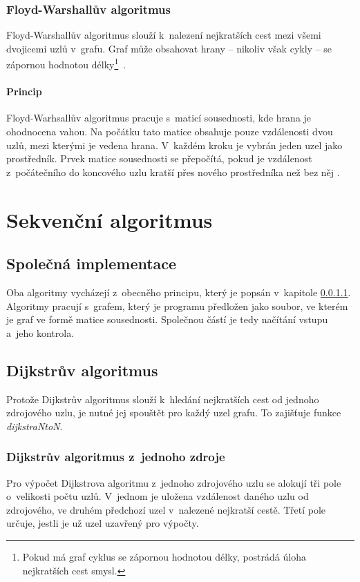 \subsubsection{Floyd-Warshallův algoritmus}
Floyd-Warshallův algoritmus slouží k~nalezení nejkratších cest mezi všemi dvojicemi uzlů v~grafu. Graf může obsahovat hrany -- nikoliv však cykly -- se zápornou hodnotou délky\footnote{Pokud má graf cyklus se zápornou hodnotou délky, postrádá úloha nejkratších cest smysl.}~\cite{w:fw:def}.

\paragraph{Princip} \label{l:fw:princip}
Floyd-Warhsallův algoritmus pracuje s~maticí sousednosti, kde hrana je ohodnocena vahou. Na počátku tato matice obsahuje pouze vzdá\-le\-no\-sti dvou uzlů, mezi kterými je vedena hrana.
V~každém kroku je vybrán jeden uzel jako prostředník. Prvek matice sousednosti se přepočítá, pokud je vzdálenost z~počátečního do koncového uzlu kratší přes nového prostředníka než bez něj \cite{w:fw:def}.


\section{Sekvenční algoritmus}
\subsection{Společná implementace}
Oba algoritmy vycházejí z~obecněho principu, který je popsán v~kapitole \ref{l:fw:princip}. Algoritmy pracují s~grafem, který je programu předložen jako soubor, ve kterém je graf ve formě matice sousednosti. Společnou částí je tedy načítání vstupu a~jeho kontrola.

\subsection{Dijkstrův algoritmus}
Protože Dijkstrův algoritmus slouží k~hledání nejkratších cest od jednoho zdrojového uzlu, je nutné jej spouštět pro každý uzel grafu. To zajišťuje funkce \textit{dijkstraNtoN}.

\subsubsection{Dijkstrův algoritmus z~jednoho zdroje}
Pro výpočet Dijkstrova algoritmu z~jednoho zdrojového uzlu se alokují tři pole o~velikosti počtu uzlů. V~jednom je uložena vzdálenost daného uzlu od zdrojového, ve druhém předchozí uzel v~nalezené nejkratší cestě. Třetí pole určuje, jestli je už uzel uzavřený pro výpočty.

